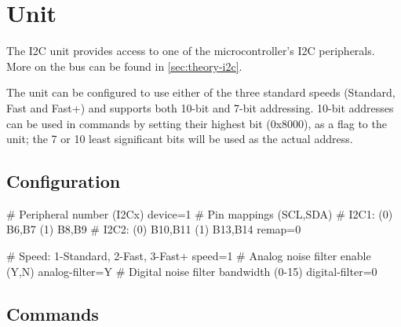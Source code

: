 \section{\IIC Unit}

The \gls{I2C} unit provides access to one of the microcontroller's \gls{I2C} peripherals. More on the \IIC bus can be found in \cref{sec:theory-i2c}.

The unit can be configured to use either of the three standard speeds (Standard, Fast and Fast+) and supports both 10-bit and 7-bit addressing. 10-bit addresses can be used in commands by setting their highest bit (0x8000), as a flag to the unit; the 7 or 10 least significant bits will be used as the actual address.

\subsection{\IIC Configuration}

\begin{inicode}
[I2C:d@4]
# Peripheral number (I2Cx)
device=1
# Pin mappings (SCL,SDA)
#  I2C1: (0) B6,B7    (1) B8,B9
#  I2C2: (0) B10,B11  (1) B13,B14
remap=0

# Speed: 1-Standard, 2-Fast, 3-Fast+
speed=1
# Analog noise filter enable (Y,N)
analog-filter=Y
# Digital noise filter bandwidth (0-15)
digital-filter=0
\end{inicode}

\subsection{\IIC Commands}

